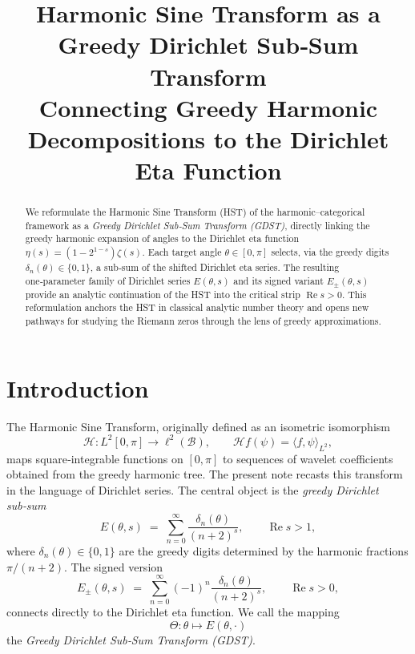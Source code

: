 \documentclass[11pt,a4paper]{article}
\title{\bfseries Harmonic Sine Transform as a Greedy Dirichlet Sub‑Sum Transform\\
\large Connecting Greedy Harmonic Decompositions to the Dirichlet Eta Function}
\author{}
\date{}
\begin{document}
\maketitle

\begin{abstract}
We reformulate the Harmonic Sine Transform (HST) of the harmonic–categorical framework as a \emph{Greedy Dirichlet Sub‑Sum Transform (GDST)}, directly linking the greedy harmonic expansion of angles to the Dirichlet eta function \(\eta(s)=(1-2^{1-s})\zeta(s)\).  Each target angle \(\theta\in[0,\pi]\) selects, via the greedy digits \(\delta_n(\theta)\in\{0,1\}\), a sub‑sum of the shifted Dirichlet eta series.  The resulting one‑parameter family of Dirichlet series \(E(\theta,s)\) and its signed variant \(E_\pm(\theta,s)\) provide an analytic continuation of the HST into the critical strip \(\operatorname{Re}s>0\).  This reformulation anchors the HST in classical analytic number theory and opens new pathways for studying the Riemann zeros through the lens of greedy approximations.
\end{abstract}

\section{Introduction}
The Harmonic Sine Transform, originally defined as an isometric isomorphism
\[
\mathcal{H}: L^2[0,\pi] \longrightarrow \ell^2(\mathcal{B}),\qquad
\mathcal{H}f(\psi)=\langle f,\psi\rangle_{L^2},
\]
maps square‑integrable functions on \([0,\pi]\) to sequences of wavelet coefficients obtained from the greedy harmonic tree.  The present note recasts this transform in the language of Dirichlet series.  The central object is the \emph{greedy Dirichlet sub‑sum}
\[
E(\theta,s) \;=\; \sum_{n=0}^{\infty} \frac{\delta_n(\theta)}{(n+2)^s},
\qquad \operatorname{Re}s>1,
\]
where \(\delta_n(\theta)\in\{0,1\}\) are the greedy digits determined by the harmonic fractions \(\pi/(n+2)\).  The signed version
\[
E_\pm(\theta,s) \;=\; \sum_{n=0}^{\infty} (-1)^n \frac{\delta_n(\theta)}{(n+2)^s},
\qquad \operatorname{Re}s>0,
\]
connects directly to the Dirichlet eta function.  We call the mapping
\[
\Theta: \theta \longmapsto E(\theta,\cdot)
\]
the \emph{Greedy Dirichlet Sub‑Sum Transform (GDST)}.
\end{document}
